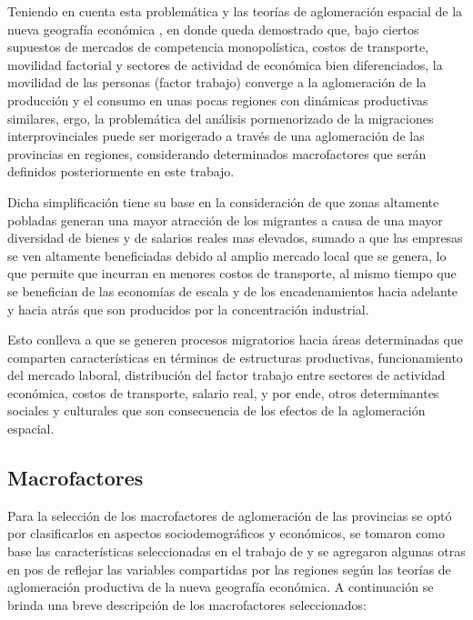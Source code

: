 \documentclass[12pt,a4paper]{article}
\begin{document}
Teniendo en cuenta esta problemática y las teorías de aglomeración espacial de la nueva geografía económica \parencite{krugman_increasing_1991}, en donde queda demostrado que, bajo ciertos supuestos de mercados de competencia monopolística, costos de transporte, movilidad factorial y sectores de actividad de económica bien diferenciados, la movilidad de las personas (factor trabajo) converge a la aglomeración de la producción y el consumo en unas pocas regiones con dinámicas productivas similares, ergo, la problemática del análisis pormenorizado de la migraciones interprovinciales puede ser morigerado a través de una aglomeración de las provincias en regiones, considerando determinados macrofactores que serán definidos posteriormente en este trabajo. 

Dicha simplificación tiene su base en la consideración de que  zonas altamente pobladas generan una mayor atracción de los migrantes a causa de una mayor diversidad de bienes y de salarios reales mas elevados, sumado a que las empresas se ven altamente beneficiadas debido al amplio mercado local que se genera, lo que permite que incurran en menores costos de transporte, al mismo tiempo que se benefician de las economías de escala y de los encadenamientos hacia adelante y hacia atrás que son producidos por la concentración industrial. 

Esto conlleva a que se generen procesos migratorios hacia áreas determinadas que comparten características en términos de estructuras productivas, funcionamiento del mercado laboral, distribución del factor trabajo entre sectores de actividad económica, costos de transporte, salario real, y por ende, otros determinantes sociales y culturales que son consecuencia de los efectos de la aglomeración espacial.
\subsection{Macrofactores}

Para la selección de los macrofactores de aglomeración de las provincias se optó por clasificarlos en aspectos sociodemográficos y económicos, se tomaron como base las características seleccionadas en  el trabajo de \textcite{cicowiez_caracterizacion_2003} y se agregaron algunas otras en pos de reflejar las variables compartidas por las regiones según las teorías de aglomeración productiva de la nueva geografía económica. A continuación se brinda una breve descripción de los macrofactores seleccionados:
\end{document}
